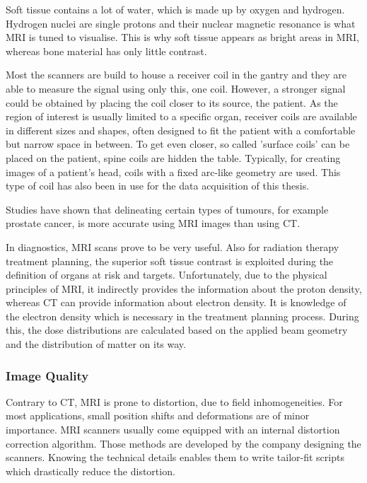 Soft tissue contains a lot of water, which is made up by oxygen and hydrogen.
Hydrogen nuclei are single protons and their nuclear magnetic resonance is what MRI is tuned to visualise.
This is why soft tissue appears as bright areas in MRI, whereas bone material has only little contrast. \cite{Currie2013}


Most the scanners are build to house a receiver coil in the gantry and they are able to measure the signal using only this, one coil.
However, a stronger signal could be obtained by placing the coil closer to its source, the patient.
As the region of interest is usually limited to a specific organ, receiver coils are available in different sizes and shapes, often designed to fit the patient with a comfortable but narrow space in between.
To get even closer, so called 'surface coils' can be placed on the patient, spine coils are hidden the table.
Typically, for creating images of a patient's head, coils with a fixed arc-like geometry are used.
This type of coil has also been in use for the data acquisition of this thesis.

Studies have shown that delineating certain types of tumours, for example prostate cancer, is more accurate using MRI images than using CT. \cite{Rasch1999, Debois1999a, Roach1996}

In diagnostics, MRI scans prove to be very useful.
Also for radiation therapy treatment planning, the superior soft tissue contrast is exploited during the definition of organs at risk and targets.
Unfortunately, due to the physical principles of MRI, it indirectly provides the information about the proton density, whereas CT can provide information about electron density.
It is knowledge of the electron density which is necessary in the treatment planning process.
During this, the dose distributions are calculated based on the applied beam geometry and the distribution of matter on its way.


\subsubsection{Image Quality}
Contrary to CT, MRI is prone to distortion, due to field inhomogeneities.
For most applications, small position shifts and deformations are of minor importance.
MRI scanners usually come equipped with an internal distortion correction algorithm.
Those methods are developed by the company designing the scanners.
Knowing the technical details enables them to write tailor-fit scripts which drastically reduce the distortion.

